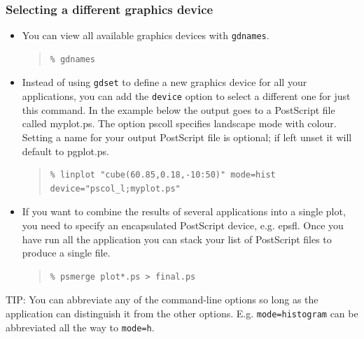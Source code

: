 \documentclass[twoside,11pt]{article}
\newenvironment{latexonly}{}{}
\renewcommand{\_}{\texttt{\symbol{95}}}
\newenvironment{fmpage}[1]{\begin{lrbox}{\fmbox}\begin{minipage}{#1}}{\end{minipage}\end{lrbox}\fbox{\usebox{\fmbox}}}
\newenvironment{myquote}{
   \color{MidnightBlue}\begin{quote}\begin{small}}{
   \end{small}\end{quote}
}
\newcommand{\param}[1]{\texttt{#1}}
\renewenvironment{myquote}{
      \begin{quote}\begin{small}}{
      \end{small}\end{quote}
   }
\begin{document}
\subsubsection{Selecting a different graphics device}

\begin{itemize}
\item You can view all available graphics devices with \param{gdnames}.
\begin{myquote}
\begin{verbatim}
% gdnames
\end{verbatim}
\end{myquote}

\item Instead of using \param{gdset} to define a new graphics device for all your applications, you can add the \param{device} option to select a different one for just this command. In the example below the output goes to a PostScript file called myplot.ps. The option pscol\_l specifies landscape mode with colour. Setting a name for your output PostScript file is optional; if left unset it will default to pgplot.ps.
\begin{myquote}
\begin{verbatim}
% linplot "cube(60.85,0.18,-10:50)" mode=hist device="pscol_l;myplot.ps"
\end{verbatim}
\end{myquote}

\item If you want to combine the results of several applications into a single plot, you need to specify an encapsulated PostScript device, e.g. epsf\_l. Once you have run all the application you can stack your list of PostScript files to produce a single file.
\begin{myquote}
\begin{verbatim}
% psmerge plot*.ps > final.ps
\end{verbatim}
\end{myquote}
\end{itemize}


\begin{latexonly}
\begin{center}
\begin{fmpage}{0.95\linewidth}
\vspace{0.1cm}
TIP: You can abbreviate any of the command-line options so long as the application can distinguish it from the other options. E.g. \param{mode=histogram} can be abbreviated all the way to \param{mode=h}.
\end{fmpage}
\end{center}
\end{latexonly}
\end{document}

